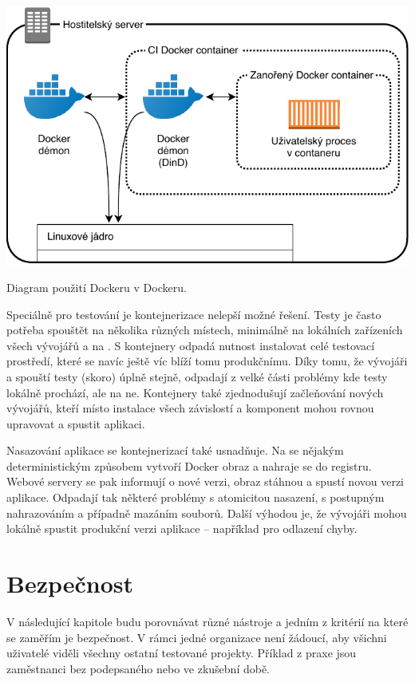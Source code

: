         \begin{iffigure}
            \centering
            \includegraphics[width=\textwidth]{media/dind-ci.pdf}
            \caption{Diagram použití Dockeru v Dockeru.}
            \label{fig:dind-ci}
        \end{iffigure}

        Speciálně pro testování je kontejnerizace nelepší možné řešení. Testy je často potřeba spouštět na několika různých místech, minimálně na lokálních zařízeních všech vývojářů a na \CI. S kontejnery odpadá nutnost instalovat celé testovací prostředí, které se navíc ještě víc blíží tomu produkčnímu. Díky tomu, že vývojáři a \CI spouští testy (skoro) úplně stejně, odpadají z velké části problémy kde testy lokálně prochází, ale na \CI ne. Kontejnery také zjednodušují začleňování nových vývojářů, kteří místo instalace všech závislostí a komponent mohou rovnou upravovat a spustit aplikaci.

        Nasazování aplikace se kontejnerizací také usnadňuje. Na \CI se nějakým deterministickým způsobem vytvoří Docker obraz a nahraje se do registru. Webové servery se pak informují o nové verzi, obraz stáhnou a spustí novou verzi aplikace. Odpadají tak některé problémy s atomicitou nasazení, s postupným nahrazováním a případně mazáním souborů. Další výhodou je, že vývojáři mohou lokálně spustit produkční verzi aplikace -- například pro odlazení chyby.

    \section*{Bezpečnost}
        V následující kapitole budu porovnávat různé \CI nástroje a jedním z kritérií na které se zaměřím je bezpečnost. V rámci jedné organizace není žádoucí, aby všichni uživatelé viděli všechny ostatní testované projekty. Příklad z praxe jsou zaměstnanci bez podepsaného  nebo ve zkušební době.

